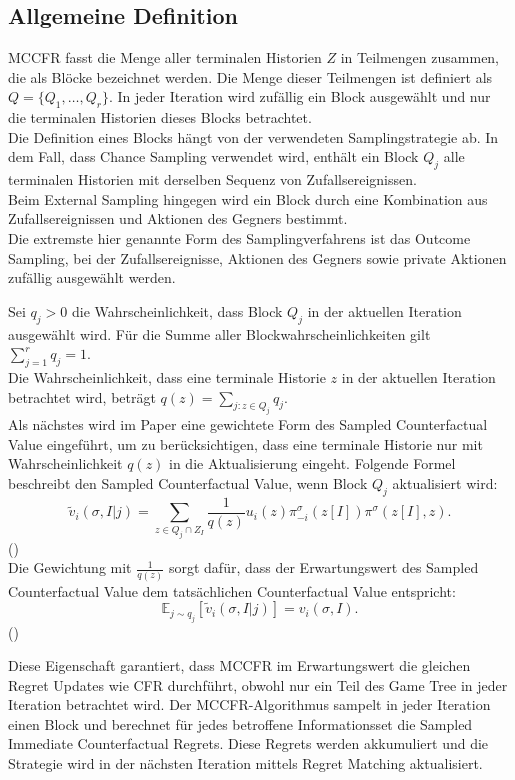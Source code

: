 \subsection{Allgemeine Definition}
MCCFR fasst die Menge aller terminalen Historien $Z$ in Teilmengen zusammen, die als Blöcke bezeichnet werden.
Die Menge dieser Teilmengen ist definiert als $Q = \{Q_1, \ldots, Q_r\}$.
In jeder Iteration wird zufällig ein Block ausgewählt und nur die terminalen Historien dieses Blocks betrachtet.\\
Die Definition eines Blocks hängt von der verwendeten Samplingstrategie ab.
In dem Fall, dass Chance Sampling verwendet wird, enthält ein Block $Q_j$ alle terminalen Historien mit derselben Sequenz von Zufallsereignissen.\\
Beim External Sampling hingegen wird ein Block durch eine Kombination aus Zufallsereignissen und Aktionen des Gegners bestimmt.\\
Die extremste hier genannte Form des Samplingverfahrens ist das Outcome Sampling, bei der Zufallsereignisse, Aktionen des Gegners sowie private Aktionen zufällig ausgewählt werden.

Sei $q_j > 0$ die Wahrscheinlichkeit, dass Block $Q_j$ in der aktuellen Iteration ausgewählt wird. 
Für die Summe aller Blockwahrscheinlichkeiten gilt $\sum_{j=1}^r q_j = 1$.\\
Die Wahrscheinlichkeit, dass eine terminale Historie $z$ in der aktuellen Iteration betrachtet wird, beträgt $q(z) = \sum_{j:z \in Q_j} q_j$.\\
Als nächstes wird im Paper eine gewichtete Form des Sampled Counterfactual Value eingeführt, um zu berücksichtigen, dass eine terminale Historie nur mit Wahrscheinlichkeit $q(z)$ in die Aktualisierung eingeht.
Folgende Formel beschreibt den Sampled Counterfactual Value, wenn Block $Q_j$ aktualisiert wird:
\begin{equation}
\tilde{v}_i(\sigma, I|j) = \sum_{z \in Q_j \cap Z_I} \frac{1}{q(z)} u_i(z) \pi_{-i}^\sigma(z[I]) \pi^\sigma(z[I], z).
\end{equation}
(\cite[Eq.~6]{lanctot2009monte})\\
Die Gewichtung mit $\frac{1}{q(z)}$ sorgt dafür, dass der Erwartungswert des Sampled Counterfactual Value dem tatsächlichen Counterfactual Value entspricht:
\begin{equation}
\mathbb{E}_{j \sim q_j}[\tilde{v}_i(\sigma, I|j)] = v_i(\sigma, I).
\end{equation}
(\cite[Lemma~1]{lanctot2009monte})

Diese Eigenschaft garantiert, dass MCCFR im Erwartungswert die gleichen Regret Updates wie CFR durchführt, obwohl nur ein Teil des Game Tree in jeder Iteration betrachtet wird.
Der MCCFR-Algorithmus sampelt in jeder Iteration einen Block und berechnet für jedes betroffene Informationsset die Sampled Immediate Counterfactual Regrets.
Diese Regrets werden akkumuliert und die Strategie wird in der nächsten Iteration mittels Regret Matching aktualisiert.

